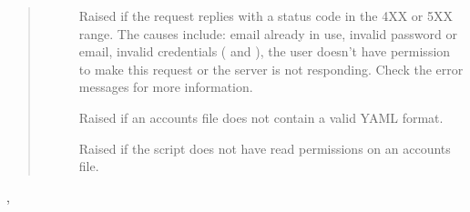\documentclass[letterpaper,10pt,english]{sphinxmanual}
\begin{document}
\begin{fulllineitems}
\begin{quote}
\begin{description}
\begin{description}
\item[{}] \leavevmode
Raised if the request replies with a status code in the 4XX or 5XX range.
The causes include: email already in use, invalid password or email,
invalid credentials ( and ), the user doesn’t have
permission to make this request or the server is not responding. Check the
error messages for more information.

\item[{}] \leavevmode
Raised if an accounts file does not contain a valid YAML format.

\item[{}] \leavevmode
Raised if the script does not have read permissions on an accounts file.

\end{description}

\end{description}\end{quote}




{\hyperref[\detokenize{accounts:gpAccounts.getOrCreateUser}]{}}, {\hyperref[\detokenize{yamlUtility:yamlUtility.getYamlContent}]{}}



\end{fulllineitems}

\end{document}
